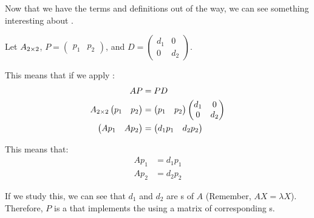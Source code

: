 Now that we have the terms and definitions out of the way, we can see something interesting about .
\begin{blackbox}
  Let $A_{2 \times 2}$, $P =
  \begin{pmatrix}
    p_{1} & p_{2}
  \end{pmatrix}
  $, and $D =
  \begin{pmatrix}
    d_{1} & 0 \\
    0 & d_{2}
  \end{pmatrix}$.

  This means that if we apply :
  \begin{align*}
    AP &= PD \\
    A_{2 \times 2}
    \begin{pmatrix}
      p_{1} & p_{2}
    \end{pmatrix} &=
                    \begin{pmatrix}
                      p_{1} & p_{2}
                    \end{pmatrix}
                              \begin{pmatrix}
                                d_{1} & 0 \\
                                0 & d_{2} \\
                              \end{pmatrix} \\
    \begin{pmatrix}
      A p_{1} & A p_{2}
    \end{pmatrix} &=
                    \begin{pmatrix}
                      d_{1} p_{1} & d_{2} p_{2}
                    \end{pmatrix}
  \end{align*}

  This means that:
  \begin{align*}
    A p_{1} &= d_{1} p_{1} \\
    A p_{2} &= d_{2} p_{2}
  \end{align*}

  If we study this, we can see that $d_{1}$ and $d_{2}$ are s of $A$ (Remember, $AX = \lambda X$).
  Therefore, $P$ is a  that implements the  using a matrix of corresponding s.
\end{blackbox}

